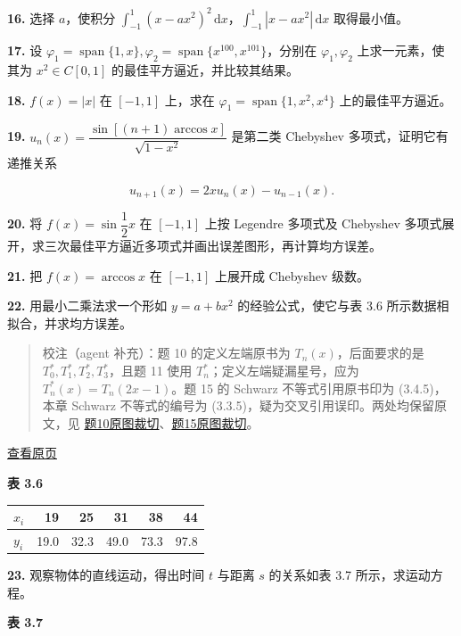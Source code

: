 \documentclass[
  10pt,
  fontset=fandol]{ctexart}
\newcounter{none} %
\begin{document}
\textbf{16.} 选择 \(a\)，使积分 \(\displaystyle\int_{-1}^1(x-ax^2)^2\,\mathrm dx\)，\(\displaystyle\int_{-1}^1|x-ax^2|\,\mathrm dx\) 取得最小值。

\textbf{17.} 设 \(\varphi_1=\operatorname{span}\{1,x\},\varphi_2=\operatorname{span}\{x^{100},x^{101}\}\)，分别在 \(\varphi_1,\varphi_2\) 上求一元素，使其为 \(x^2\in C[0,1]\) 的最佳平方逼近，并比较其结果。

\textbf{18.} \(f(x)=|x|\) 在 \([-1,1]\) 上，求在 \(\varphi_1=\operatorname{span}\{1,x^2,x^4\}\) 上的最佳平方逼近。

\textbf{19.} \(u_n(x)=\dfrac{\sin[(n+1)\arccos x]}{\sqrt{1-x^2}}\) 是第二类 Chebyshev 多项式，证明它有递推关系

\[
u_{n+1}(x)=2xu_n(x)-u_{n-1}(x).
\]

\textbf{20.} 将 \(f(x)=\sin\dfrac12x\) 在 \([-1,1]\) 上按 Legendre 多项式及 Chebyshev 多项式展开，求三次最佳平方逼近多项式并画出误差图形，再计算均方误差。

\textbf{21.} 把 \(f(x)=\arccos x\) 在 \([-1,1]\) 上展开成 Chebyshev 级数。

\textbf{22.} 用最小二乘法求一个形如 \(y=a+bx^2\) 的经验公式，使它与表 3.6 所示数据相拟合，并求均方误差。

\begin{quote}
校注（agent 补充）：题 10 的定义左端原书为 \(T_n(x)\)，后面要求的是 \(T_0^*,T_1^*,T_2^*,T_3^*\)，且题 11 使用 \(T_n^*\)；定义左端疑漏星号，应为 \(T_n^*(x)=T_n(2x-1)\)。题 15 的 Schwarz 不等式引用原书印为 (3.4.5)，本章 Schwarz 不等式的编号为 (3.3.5)，疑为交叉引用误印。两处均保留原文，见 \href{../assets/ch03b/p091-exercise-10.png}{题10原图裁切}、\href{../assets/ch03b/p091-exercise-15.png}{题15原图裁切}。
\end{quote}

\href{../../source-images/pdf-092.jpeg}{查看原页}

\textbf{表 3.6}

{\def\LTcaptype{none} %
\begin{longtable}[]{@{}lrrrrr@{}}
\toprule\noalign{}
\(x_i\) & 19 & 25 & 31 & 38 & 44 \\
\midrule\noalign{}
\endhead
\bottomrule\noalign{}
\endlastfoot
\(y_i\) & 19.0 & 32.3 & 49.0 & 73.3 & 97.8 \\
\end{longtable}
}

\textbf{23.} 观察物体的直线运动，得出时间 \(t\) 与距离 \(s\) 的关系如表 3.7 所示，求运动方程。

\textbf{表 3.7}
\end{document}
